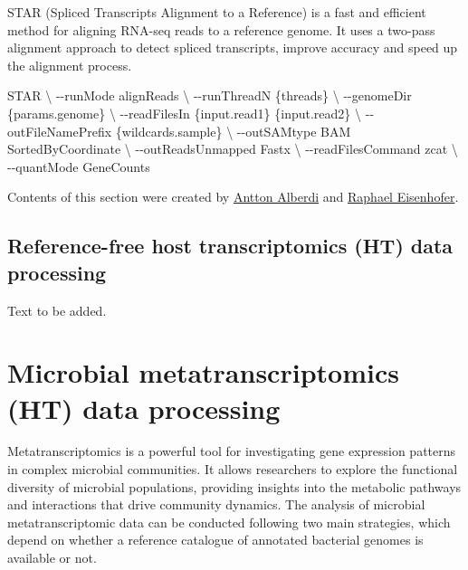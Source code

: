 \documentclass[
]{book}
\newenvironment{Shaded}{\begin{snugshade}}{\end{snugshade}}
\newcommand{\AttributeTok}[1]{\textcolor[rgb]{0.77,0.63,0.00}{#1}}
\newcommand{\DataTypeTok}[1]{\textcolor[rgb]{0.13,0.29,0.53}{#1}}
\newcommand{\ExtensionTok}[1]{#1}
\newcommand{\NormalTok}[1]{#1}
\begin{document}
STAR (Spliced Transcripts Alignment to a Reference) is a fast and efficient method for aligning RNA-seq reads to a reference genome. It uses a two-pass alignment approach to detect spliced transcripts, improve accuracy and speed up the alignment process.

\begin{Shaded}
\begin{Highlighting}[]
\ExtensionTok{STAR} \DataTypeTok{\textbackslash{}}
      \AttributeTok{{-}{-}runMode}\NormalTok{ alignReads }\DataTypeTok{\textbackslash{}}
      \AttributeTok{{-}{-}runThreadN}\NormalTok{ \{threads\} }\DataTypeTok{\textbackslash{}}
      \AttributeTok{{-}{-}genomeDir}\NormalTok{ \{params.genome\} }\DataTypeTok{\textbackslash{}}
      \AttributeTok{{-}{-}readFilesIn}\NormalTok{ \{input.read1\} \{input.read2\} }\DataTypeTok{\textbackslash{}}
      \AttributeTok{{-}{-}outFileNamePrefix}\NormalTok{ \{wildcards.sample\} }\DataTypeTok{\textbackslash{}}
      \AttributeTok{{-}{-}outSAMtype}\NormalTok{ BAM SortedByCoordinate }\DataTypeTok{\textbackslash{}}
      \AttributeTok{{-}{-}outReadsUnmapped}\NormalTok{ Fastx }\DataTypeTok{\textbackslash{}}
      \AttributeTok{{-}{-}readFilesCommand}\NormalTok{ zcat }\DataTypeTok{\textbackslash{}}
      \AttributeTok{{-}{-}quantMode}\NormalTok{ GeneCounts}
\end{Highlighting}
\end{Shaded}

Contents of this section were created by \protect\hyperlink{antton-alberdi}{Antton Alberdi} and \protect\hyperlink{raphael-eisenhofer}{Raphael Eisenhofer}.

\hypertarget{host-transcriptomics-data-processing-reference-free}{%
\section{Reference-free host transcriptomics (HT) data processing}\label{host-transcriptomics-data-processing-reference-free}}

Text to be added.

\hypertarget{microbial-metatranscriptomics-data-processing}{%
\chapter{Microbial metatranscriptomics (HT) data processing}\label{microbial-metatranscriptomics-data-processing}}

Metatranscriptomics is a powerful tool for investigating gene expression patterns in complex microbial communities. It allows researchers to explore the functional diversity of microbial populations, providing insights into the metabolic pathways and interactions that drive community dynamics. The analysis of microbial metatranscriptomic data can be conducted following two main strategies, which depend on whether a reference catalogue of annotated bacterial genomes is available or not.
\end{document}
